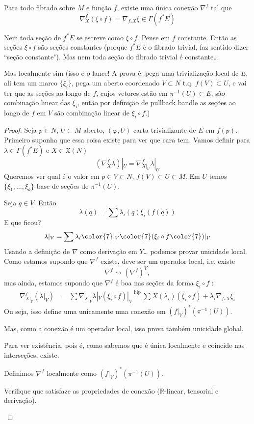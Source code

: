 \begin{prop}\leavevmode
Para todo fibrado sobre \(M\) e função \(f\), existe uma única conexão \(\nabla^f\) tal que
\[\nabla_X^f(\xi \circ f)=\nabla_{f_*X}\xi \in \Gamma(f^*E)\]

\end{prop}
\begin{remark}\leavevmode
Nem toda seção de \(f^*E\) se escreve como \(\xi \circ f\). Pense em \(f\) constante. Então as seções \(\xi \circ f\) são seções constantes (porque \(f^*E\) é o fibrado trivial, faz sentido dizer ``seção constante"). Mas nem toda seção do fibrado trivial é constante…

Mas localmente sim {\color{2}(isso é o lance! A prova é: pega uma trivialização local de \(E\), ali tem um marco \(\{\xi_i\}\), pega um aberto coordenado \(V \subset N\) t.q. \(f(V)\subset U\), e vai ter que as seções ao longo de \(f\), cujos vetores estão em \(\pi^{-1}(U)\subset E\), são combinação linear das \(\xi_i\), então por definição de pullback bandle as seções ao longo de \(f\) em \(V\) são combinação linear de \(\xi_i \circ f\).)}
\end{remark}

\begin{proof}\leavevmode
Seja \(p \in N\), \(U \subset M\) aberto, \((\varphi,U)\) carta trivializante de \(E\) em \(f(p)\). Primeiro suponha que essa coisa existe para ver que cara tem. Vamos definir para \(\lambda \in \Gamma(f^*E)\) e \(X \in \mathfrak{X}(N)\)
\[(\nabla_X^f \lambda)|_{U}=\nabla_{X|_{U}}^f \lambda|_{U}\]
Queremos ver qual é o valor em \(p \in V \subset N\), \(f(V) \subset U \subset M\). Em \(U\) temos \(\{\xi_1,\ldots,\xi_k\}\) base de seções de \(\pi^{-1}(U)\).

Seja \(q \in V\). Então
\[\lambda(q)=\sum\lambda_i(q) \xi_i(f(q))\]
E que ficou?
\[\lambda|_{V}=\sum\lambda_i{\color{7}|_{V}} {\color{7}(}\xi_i \circ f{\color{7})|_{V}}\]
Usando a definição de \(\nabla\) como derivação em \(Y\)… podemos provar unicidade local. {\color{2}Como estamos supondo que \(\nabla^f\) existe, deve ser um operador local, i.e. existe} 
\[\nabla^f \rightsquigarrow  (\nabla^f)^V,\]
{\color{2}mas ainda, estamos supondo que \(\nabla^f\) é boa nas seções da forma \(\xi_i \circ f\) }:
\begin{align*}
\nabla_{X|_{V}}^f(\lambda|_{V})&=\sum\nabla_{X|_{V}}\lambda|_{V}(\xi_i \circ f)|_{V}\overset{\operatorname{hip}}{=}\sum X(\lambda_i)(\xi_i \circ f)+\lambda_i\nabla_{f_*X}\xi_i
\end{align*}
Ou seja, isso define uma unicamente uma conexão em \((f|_{V})^*(\pi^{-1}(U))\).

Mas, como a conexão é um operador local, isso prova também unicidade global. 

Para ver existência, pois é, como sabemos que é única localmente e coincide nas interseções, existe.

Definimos \(\nabla^f\) localmente como \((f|_{V})^*(\pi^{-1}(U))\).

\begin{exercise}\leavevmode
Verifique que satisfaze as propriedades de conexão (\(\mathbb{R}\)-linear, tensorial e derivação).
\end{exercise}
\end{proof}

